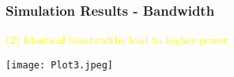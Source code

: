 \documentclass[10pt,dvipsnames,table]{beamer}
\DeclarePairedDelimiter\ceil{\lceil}{\rceil}
\begin{document}
\begin{frame}
\frametitle{Simulation Results - Bandwidth}
\textcolor{yellow}{(2) Identical bandwidths lead to higher power}

\texttt{[image: Plot3.jpeg]}
\end{frame}






\end{document}
